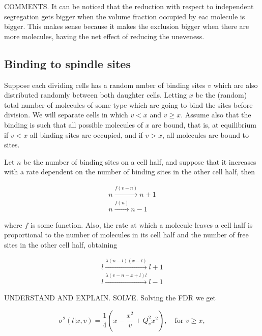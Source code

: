 COMMENTS. It can be noticed that the reduction with respect to independent segregation gets bigger when the volume fraction occupied by eac molecule is bigger. This makes sense because it makes the exclusion bigger when there are more molecules, having the net effect of reducing the uneveness.

\subsection{Binding to spindle sites}

Suppose each dividing cells has a random nmber of binding sites $v$ which are also distributed randomly between both daughter cells. Letting $x$ be the (random) total number of molecules of some type which are going to bind the sites before division. We will separate cells in which $v<x$ and $v\geq x$. Assume also that the binding is such that all possible molecules of $x$ are bound, that is, at equilibrium if $v<x$ all binding sites are occupied, and if $v>x$, all molecules are bound to sites.

Let $n$ be the number of binding sites on a cell half, and suppose that it increases with a rate dependent on the number of binding sites in the other cell half, then

\begin{equation}
  \begin{split}
    n\xrightarrow{f(v-n)}n+1\\
    n\xrightarrow{f(n)}n-1
  \end{split}
\end{equation}

where $f$ is some function. Also, the rate at which a molecule leaves a cell half is proportional to the number of molecules in its cell half and the number of free sites in the other cell half, obtaining

\begin{equation}
  \begin{split}
    l\xrightarrow{\lambda(n-l)(x-l)}l+1\\
    l\xrightarrow{\lambda(v-n-x+l)l}l-1
  \end{split}
\end{equation}

UNDERSTAND AND EXPLAIN. SOLVE. Solving the FDR we get

\begin{equation}
  \sigma^2(l|x,v) =\frac{1}{4}\left(x-\frac{x^2}{v}+Q_v^2x^2\right),\quad \text{for } v\geq x,
\end{equation}

